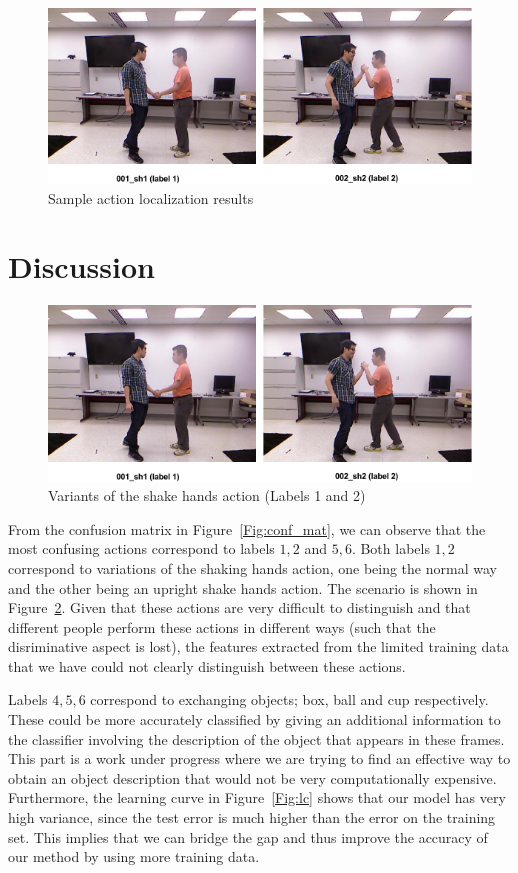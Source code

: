\documentclass[10pt,twocolumn,letterpaper]{article}
\begin{document}
\begin{figure}
\centering
\includegraphics[scale=0.3]{sh_conf.png}
\caption{Sample action localization results}
\label{Fig:act_loc_2}
\end{figure}


\section{Discussion}

\begin{figure}[ht]
\centering
\includegraphics[scale=0.3]{sh_conf.png}
\caption{Variants of the shake hands action (Labels 1 and 2)}
\label{Fig:sh_conf}
\end{figure}
From the confusion matrix in Figure~\ref{Fig:conf_mat}, we can observe that the most confusing actions correspond to labels ${1,2}$ and ${5,6}$. Both labels ${1,2}$ correspond  to variations of the shaking hands action, one being the normal way and the other being an upright shake hands action. The scenario is shown in Figure~\ref{Fig:sh_conf}. Given that these actions are very difficult to distinguish and that different people perform these actions in different ways (such that the disriminative aspect is lost), the features extracted from the limited training data that we have could not clearly distinguish between these actions. 

Labels ${4,5,6}$ correspond to exchanging objects; box, ball and cup respectively. These could be more accurately classified by giving an additional information to the classifier involving the description of the object that appears in these frames. This part is a work under progress where we are trying to find an effective way to obtain an object description that would not be very computationally expensive. 
Furthermore, the learning curve in Figure~\ref{Fig:lc} shows that our model has very high variance, since the test error is much higher than the error on the training set. This implies that we can bridge the gap and thus improve the accuracy of our method by using more training data. 
\end{document}
